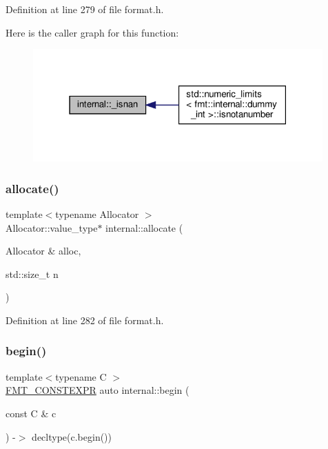 Definition at line 279 of file format.\+h.

Here is the caller graph for this function\+:
\nopagebreak
\begin{figure}[H]
\begin{center}
\leavevmode
\includegraphics[width=315pt]{namespaceinternal_a29338fd1e0c44c56648c890308cdf0e0_icgraph}
\end{center}
\end{figure}
\mbox{\label{namespaceinternal_a206460458512df6c652fd536d62dfda8}} 
\subsubsection{\texorpdfstring{allocate()}{allocate()}}
{\footnotesize\ttfamily template$<$typename Allocator $>$ \\
Allocator\+::value\+\_\+type$\ast$ internal\+::allocate (\begin{DoxyParamCaption}\item[{Allocator \&}]{alloc,  }\item[{std\+::size\+\_\+t}]{n }\end{DoxyParamCaption})}



Definition at line 282 of file format.\+h.

\mbox{\label{namespaceinternal_a265f36d9dee68d3f44381347ef2fd5cb}} 
\subsubsection{\texorpdfstring{begin()}{begin()}\hspace{0.1cm}{\footnotesize\ttfamily [1/2]}}
{\footnotesize\ttfamily template$<$typename C $>$ \\
\hyperlink{core_8h_a69201cb276383873487bf68b4ef8b4cd}{F\+M\+T\+\_\+\+C\+O\+N\+S\+T\+E\+X\+PR} auto internal\+::begin (\begin{DoxyParamCaption}\item[{const C \&}]{c }\end{DoxyParamCaption}) -\/$>$ decltype(c.\+begin()) }



